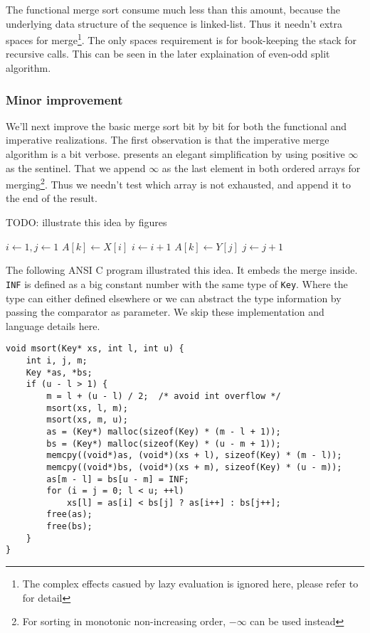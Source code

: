 \documentclass{article}
\begin{document}
The functional merge sort consume much less than this amount, because the underlying data structure
of the sequence is linked-list. Thus it needn't extra spaces for merge\footnote{The complex effects
casued by lazy evaluation is ignored here, please refer to \cite{algo-fp} for detail}. 
The only spaces requirement is for book-keeping the stack for recursive calls. This can be
seen in the later explaination of even-odd split algorithm.

\subsubsection{Minor improvement}

We'll next improve the basic merge sort bit by bit for both the functional and imperative realizations.
The first observation is that the imperative merge algorithm is a bit verbose. \cite{CLRS} presents
an elegant simplification by using positive $\infty$ as the sentinel. That we append $\infty$ as
the last element in both ordered arrays for merging\footnote{For sorting in monotonic non-increasing order,
$-\infty$ can be used instead}. Thus we needn't test which array is not exhausted, and append it 
to the end of the result.

TODO: illustrate this idea by figures

\begin{algorithmic}
  \State {}
  \State {}
  \State $i \gets 1, j\gets 1$
      \State $A[k] \gets X[i]$
      \State $i \gets i + 1$
    \Else
      \State $A[k] \gets Y[j]$
      \State $j \gets j + 1$
    \EndIf
  \EndFor
\EndProcedure  
\end{algorithmic}

The following ANSI C program illustrated this idea. It embeds the merge inside. \verb|INF| is defined
as a big constant number with the same type of \verb|Key|. Where the type can either defined elsewhere
or we can abstract the type information by passing the comparator as parameter. We skip these
implementation and language details here.

\lstset{language=C}
\begin{lstlisting}
void msort(Key* xs, int l, int u) {
    int i, j, m;
    Key *as, *bs;
    if (u - l > 1) {
        m = l + (u - l) / 2;  /* avoid int overflow */
        msort(xs, l, m);
        msort(xs, m, u);
        as = (Key*) malloc(sizeof(Key) * (m - l + 1));
        bs = (Key*) malloc(sizeof(Key) * (u - m + 1));
        memcpy((void*)as, (void*)(xs + l), sizeof(Key) * (m - l));
        memcpy((void*)bs, (void*)(xs + m), sizeof(Key) * (u - m));
        as[m - l] = bs[u - m] = INF;
        for (i = j = 0; l < u; ++l)
            xs[l] = as[i] < bs[j] ? as[i++] : bs[j++];
        free(as);
        free(bs);
    }
}
\end{lstlisting}
\end{document}

